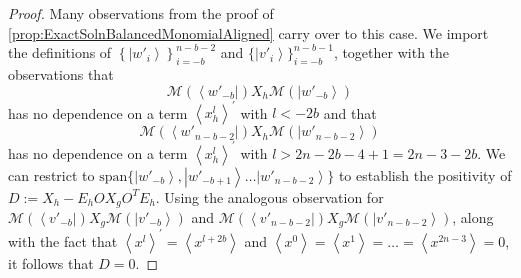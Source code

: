\documentclass{article}
\begin{document}
\begin{proof}
  Many observations from the proof of \cref{prop:ExactSolnBalancedMonomialAligned}
  carry over to this case. We import the definitions of $\left\{ \left|w'_{i}\right\rangle \right\} _{i=-b}^{n-b-2}$
  and $\{\left|v'_{i}\right\rangle \}_{i=-b}^{n-b-1}$, together with
  the observations that $$\mathcal{M}(\left\langle w'_{-b}\right|)X_{h}\mathcal{M}(\left|w'_{-b}\right\rangle )$$
  has no dependence on a term $\left\langle x_{h}^{l}\right\rangle ^{\prime}$
  with $l<-2b$
  and that $$\mathcal{M}(\left\langle w'_{n-b-2}\right|)X_{h}\mathcal{M}(\left|w'_{n-b-2}\right\rangle )$$
  has no dependence on a term $\left\langle x_{h}^{l}\right\rangle ^{\prime}$
  with $l>2n-2b-4+1=2n-3-2b$. We can restrict to $\text{span}\{\left|w'_{-b}\right\rangle ,\left|w'_{-b+1}\right\rangle \dots\left|w'_{n-b-2}\right\rangle \}$
  to establish the positivity of $D:=X_{h}-E_{h}OX_{g}O^{T}E_{h}$.
  Using the analogous observation for $\mathcal{M}(\left\langle v'_{-b}\right|)X_{g}\mathcal{M}(\left|v'_{-b}\right\rangle )$
  and $\mathcal{M}(\left\langle v'_{n-b-2}\right|)X_{g}\mathcal{M}(\left|v'_{n-b-2}\right\rangle )$,
  along with the fact that $\left\langle x^{l}\right\rangle ^{\prime}=\left\langle x^{l+2b}\right\rangle $
  and $\left\langle x^{0}\right\rangle =\left\langle x^{1}\right\rangle =\dots=\left\langle x^{2n-3}\right\rangle =0$,
  it follows that $D=0$.
\end{proof}
\end{document}
